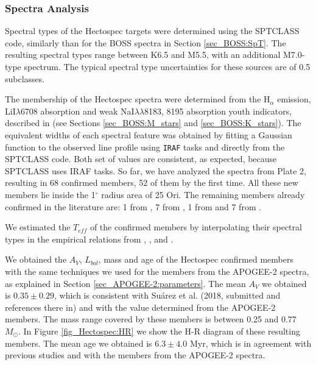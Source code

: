 \documentclass[12pt]{article}
\newcounter{subsubsubsection}[subsubsection]
\begin{document}
\subsubsection{Spectra Analysis}
\label{sec_Hectospec:analysis}

\label{sec_Hectospec:SpT}
Spectral types of the Hectospec targets were determined using the SPTCLASS code, similarly than for the BOSS spectra in Section \ref{sec_BOSS:SpT}. The resulting spectral types range between K6.5 and M5.5, with an additional M7.0-type spectrum. The typical spectral type uncertainties for these sources are of 0.5 subclasses.

\label{sec_Hectospec:membership}
The membership of the Hectospec spectra were determined from the H$_\alpha$ emission, LiI$\lambda$6708 absorption and weak NaI$\lambda\lambda$8183, 8195 absorption youth indicators, described in \citet{Suarez2017} (see Sections \ref{sec_BOSS:M_stars} and \ref{sec_BOSS:K_stars}). The equivalent widths of each spectral feature was obtained by fitting a Gaussian function to the observed line profile using \texttt{IRAF} tasks and directly from the SPTCLASS code. Both set of values are consistent, as expected, because SPTCLASS uses IRAF tasks. 
So far, we have analyzed the spectra from Plate 2, resulting in 68 confirmed members, 52 of them by the first time. All these new members lie inside the 1$^\circ$ radius area of 25 Ori. The remaining members already confirmed in the literature are: 1 from \citet{Briceno2007}, 7 from \citet{Downes2014}, 1 from \citet{Suarez2017} and 7 from \citet{Briceno2018}.

\label{sec_Hectospec:parameters}
We estimated the $T_{eff}$ of the confirmed members by interpolating their spectral types in the empirical relations from \citet{Kenyon-Hartmann1995}, \citet{Luhman1999}, \citet{Briceno2002} and \citet{Luhman2003b}.

We obtained the $A_V$, $L_{bol}$, mass and age of the Hectospec confirmed members with the same techniques we used for the members from the APOGEE-2 spectra, as explained in Section \ref{sec_APOGEE-2:parameters}. The mean $A_V$ we obtained is $0.35\pm0.29$, which is consistent with Su\'arez et al. (2018, submitted and references there in) and with the value determined from the APOGEE-2 members. The mass range covered by these members is between 0.25 and 0.77 $M_\odot$. In Figure \ref{fig_Hectospec:HR} we show the H-R diagram of these resulting members. The mean age we obtained is $6.3\pm4.0$ Myr, which is in agreement with previous studies \citep[][ and references there in]{Briceno2018} and with the members from the APOGEE-2 spectra.
\end{document}
